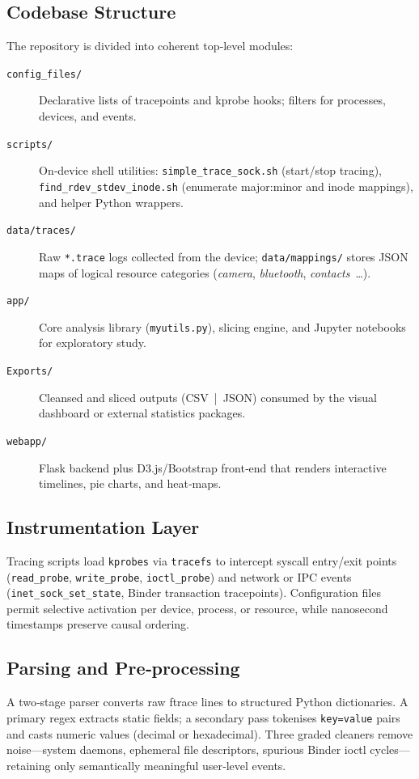 \documentclass[a4paper,12pt]{report}
\begin{document}
\subsection{Codebase Structure}
The repository is divided into coherent top‑level modules:
\begin{description}
\item[\texttt{config\_files/}] Declarative lists of tracepoints and kprobe hooks; filters for processes, devices, and events.
\item[\texttt{scripts/}] On‑device shell utilities: \texttt{simple\_trace\_sock.sh} (start/stop tracing), \texttt{find\_rdev\_stdev\_inode.sh} (enumerate major:minor and inode mappings), and helper Python wrappers.
\item[\texttt{data/traces/}] Raw \texttt{*.trace} logs collected from the device; \texttt{data/mappings/} stores JSON maps of logical resource categories (\emph{camera}, \emph{bluetooth}, \emph{contacts} \ldots).
\item[\texttt{app/}] Core analysis library (\texttt{myutils.py}), slicing engine, and Jupyter notebooks for exploratory study.
\item[\texttt{Exports/}] Cleansed and sliced outputs (CSV | JSON) consumed by the visual dashboard or external statistics packages.
\item[\texttt{webapp/}] Flask backend plus D3.js/Bootstrap front‑end that renders interactive timelines, pie charts, and heat‑maps.
\end{description}

\subsection{Instrumentation Layer}
Tracing scripts load \texttt{kprobes} via \texttt{tracefs} to intercept syscall entry/exit points (\texttt{read\_probe}, \texttt{write\_probe}, \texttt{ioctl\_probe}) and network or IPC events (\texttt{inet\_sock\_set\_state}, Binder transaction tracepoints). Configuration files permit selective activation per device, process, or resource, while nanosecond timestamps preserve causal ordering.

\subsection{Parsing and Pre‑processing}
A two‑stage parser converts raw ftrace lines to structured Python dictionaries. A primary regex extracts static fields; a secondary pass tokenises \texttt{key=value} pairs and casts numeric values (decimal or hexadecimal). Three graded cleaners remove noise—system daemons, ephemeral file descriptors, spurious Binder ioctl cycles—retaining only semantically meaningful user‑level events.
\end{document}
